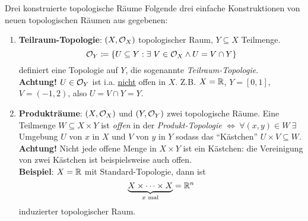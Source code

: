 \begin{bla}{Drei konstruierte topologische Räume}
  Folgende drei einfache Konstruktionen von neuen topologischen Räumen aus gegebenen:
  \begin{enumerate}

    \item \textbf{Teilraum-Topologie}: $ (X, \mathcal{O}_X) $ topologischer Raum, $ Y \subseteq X $ Teilmenge.
    \begin{equation*}
      \mathcal{O}_Y \coloneqq \{ U \subseteq Y : \exists \ V \in \mathcal{O}_X \wedge U = V \cap Y \}
    \end{equation*}
    definiert eine Topologie auf $ Y $, die sogenannte \emph{Teilraum-Topologie}. \\
    \textbf{Achtung!} $ U \in \mathcal{O}_Y $ ist i.a. \underline{nicht} offen in $ X $. Z.B. $ X = \mathbb{R} $, $ Y = [0,1] $, $ V = (-1, 2) $, also $ U = V \cap Y = Y $.

    \item \textbf{Produkträume}: $ (X, \mathcal{O}_X) $ und $ (Y, \mathcal{O}_Y) $ zwei topologische Räume. Eine Teilmenge $ W \subseteq X \times Y $ ist \emph{offen} in der \emph{Produkt-Topologie} $ \Leftrightarrow \ \forall (x, y) \in W \ \exists $ Umgebung $ U $ von $ x $ in $ X $ und $ V $ von $ y $ in $ Y $ sodass das ``Kästchen'' $ U \times V \subseteq W $. \\
    \textbf{Achtung!} Nicht jede offene Menge in $ X \times Y $ ist ein Kästchen: die Vereinigung von zwei Kästchen ist beispielsweise auch offen. \\
    \textbf{Beispiel}: $ X = \mathbb{R} $ mit Standard-Topologie, dann ist
    \begin{equation*}
      \underbrace{X \times \cdots \times X}_{x \text{ mal}} = \mathbb{R}^n
    \end{equation*}
    induzierter topologischer Raum.


\end{enumerate}
\end{bla}

